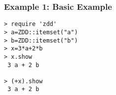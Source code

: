 \subsubsection*{Example 1: Basic Example}



\begin{Verbatim}[baselinestretch=0.7,frame=single]
> require 'zdd'
> a=ZDD::itemset("a")
> b=ZDD::itemset("b")
> x=3*a+2*b
> x.show
 3 a + 2 b

> (+x).show
 3 a + 2 b
\end{Verbatim}
